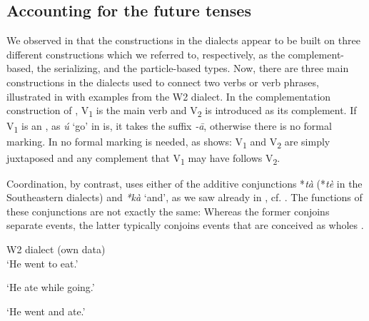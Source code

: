 \documentclass[output=paper]{langsci/langscibook}
\begin{document}
\subsection{Accounting for the future tenses}\label{sec:heine:2.1}


We observed in  that the  constructions in the  dialects appear to be built on three different constructions which we referred to, respectively, as the complement-based, the serializing, and the particle-based types. Now, there are three main constructions in the dialects used to connect two verbs or verb phrases, illustrated in  with examples from the W2 dialect. In the complementation construction of , V\textsubscript{1} is the main verb and V\textsubscript{2} is introduced as its complement. If V\textsubscript{1} is an , as \textit{ú} ‘go' in  is, it takes the  suffix \textit{-ā}, otherwise there is no formal marking. In  no formal marking is needed, as  shows: V\textsubscript{1} and V\textsubscript{2} are simply juxtaposed and any complement that V\textsubscript{1} may have follows V\textsubscript{2}. 



  Coordination, by contrast, uses either of the additive conjunctions *{\textit{tà}} (*{\textit{tè}} in the Southeastern dialects) and \textit{*kà} ‘and', as we saw already in , cf. . The functions of these conjunctions are not exactly the same: Whereas the former conjoins separate events, the latter typically conjoins events that are conceived as wholes \citep[320]{HeineKönigForthc}. 

 
\ea%
    \label{ex:heine:8} 
W2 dialect (own data)\\
  \jambox{[Complementation]}
\glt   `He went to eat.'

\glt  `He ate while going.'    

\jambox{[Coordination]}
\glt  `He went and ate.'
\z
\z
\end{document}
